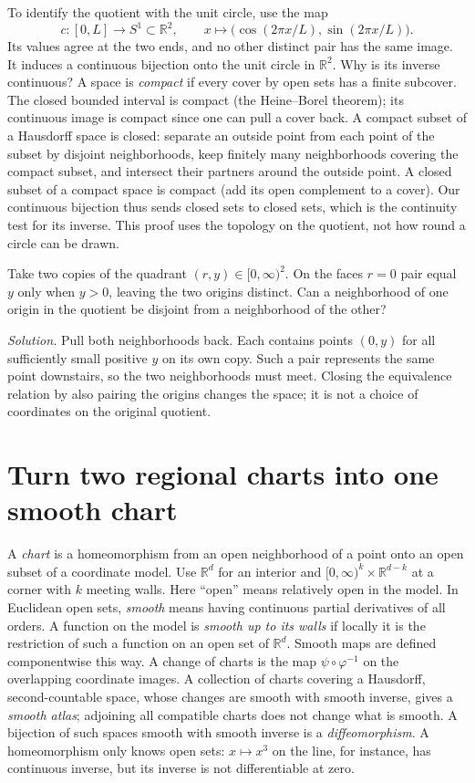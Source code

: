 To identify the quotient with the unit circle, use the map
\[
 c:[0,L]\longrightarrow S^1\subset\mathbb R^2,\qquad
 x\longmapsto\big(\cos(2\pi x/L),\sin(2\pi x/L)\big).
\]
Its values agree at the two ends, and no other distinct pair has the same image. It induces a continuous bijection onto the unit circle in $\mathbb R^2$. Why is its inverse continuous? A space is \emph{compact} if every cover by open sets has a finite subcover. The closed bounded interval is compact (the Heine--Borel theorem); its continuous image is compact since one can pull a cover back. A compact subset of a Hausdorff space is closed: separate an outside point from each point of the subset by disjoint neighborhoods, keep finitely many neighborhoods covering the compact subset, and intersect their partners around the outside point. A closed subset of a compact space is compact (add its open complement to a cover). Our continuous bijection thus sends closed sets to closed sets, which is the continuity test for its inverse. This proof uses the topology on the quotient, not how round a circle can be drawn.

\begin{exercise}
Take two copies of the quadrant $(r,y)\in[0,\infty)^2$. On the faces $r=0$ pair equal $y$ only when $y>0$, leaving the two origins distinct. Can a neighborhood of one origin in the quotient be disjoint from a neighborhood of the other?
\end{exercise}
\noindent\emph{Solution.} Pull both neighborhoods back. Each contains points $(0,y)$ for all sufficiently small positive $y$ on its own copy. Such a pair represents the same point downstairs, so the two neighborhoods must meet. Closing the equivalence relation by also pairing the origins changes the space; it is not a choice of coordinates on the original quotient.

\section{Turn two regional charts into one smooth chart}\label{D-collars}
A \emph{chart} is a homeomorphism from an open neighborhood of a point onto an open subset of a coordinate model. Use $\mathbb R^d$ for an interior and $[0,\infty)^k\times\mathbb R^{d-k}$ at a corner with $k$ meeting walls. Here ``open'' means relatively open in the model. In Euclidean open sets, \emph{smooth} means having continuous partial derivatives of all orders. A function on the model is \emph{smooth up to its walls} if locally it is the restriction of such a function on an open set of $\mathbb R^d$. Smooth maps are defined componentwise this way. A change of charts is the map $\psi\circ\varphi^{-1}$ on the overlapping coordinate images. A collection of charts covering a Hausdorff, second-countable space, whose changes are smooth with smooth inverse, gives a \emph{smooth atlas}; adjoining all compatible charts does not change what is smooth. A bijection of such spaces smooth with smooth inverse is a \emph{diffeomorphism}. A homeomorphism only knows open sets: $x\mapsto x^3$ on the line, for instance, has continuous inverse, but its inverse is not differentiable at zero.

